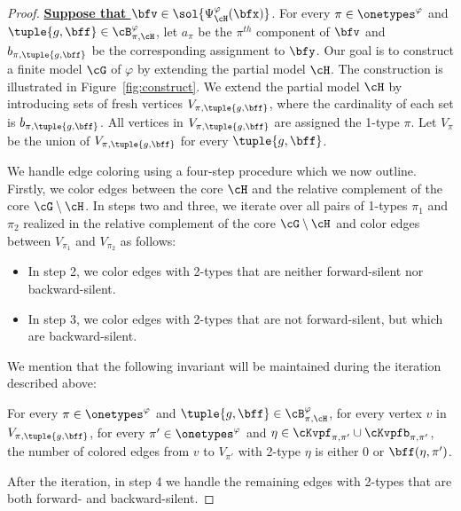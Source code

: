 \begin{proof}
    \textbf{\uline{Suppose that $\bfv \in \sol{\Psi^\varphi_\cH(\bfx)}$}}.
    For every $\pi \in \onetypes^\varphi$ and
    $\tuple{g, \bff} \in \cB^\varphi_{\pi, \cH}$,
    let $a_\pi$ be the $\pi^{th}$ component of $\bfv$ and
    $b_{\pi, \tuple{g, \bff}}$ be the corresponding assignment to $\bfy$.
    Our goal is to construct a finite model $\cG$ of $\varphi$ by extending the partial model $\cH$.
    The construction is illustrated in Figure~\ref{fig:construct}.
    We extend the partial model $\cH$ by introducing sets of fresh vertices $V_{\pi, \tuple{g, \bff}}$,
    where the cardinality of each set is $b_{\pi, \tuple{g, \bff}}$.
    All vertices in $V_{\pi, \tuple{g, \bff}}$ are assigned the 1-type $\pi$.
    Let $V_{\pi}$ be the union of $V_{\pi, \tuple{g, \bff}}$ for every $\tuple{g, \bff}$.

    We handle edge coloring using a four-step procedure which we now outline.
    Firstly, we
    color edges between the core $\cH$ and the relative complement of the core $\cG \setminus \cH$.
    In steps two and three,
    we iterate over all pairs of 1-types $\pi_1$ and $\pi_2$ realized in the relative complement of the core $\cG \setminus \cH$ and color edges between $V_{\pi_1}$ and $V_{\pi_2}$ as follows:
    \begin{itemize}
        \item In step 2, we color edges with 2-types that are neither forward-silent nor backward-silent.
        \item In step 3, we color edges with 2-types that are not forward-silent,  but which are backward-silent.
    \end{itemize}
    We mention that the following invariant will be maintained during the iteration described above:

    \medskip

    For every $\pi \in \onetypes^\varphi$ and $\tuple{g, \bff} \in \cB^\varphi_{\pi, \cH}$,
    for every vertex $v$ in $V_{\pi, \tuple{g, \bff}}$,
    for every $\pi' \in \onetypes^\varphi$ and $\eta \in \cKvpf_{\pi, \pi'} \cup \cKvpfb_{\pi, \pi'}$,
    the number of colored edges from $v$ to $V_{\pi'}$ with 2-type $\eta$ is either 0 or $\bff(\eta, \pi')$.

    \medskip

    After the iteration, in step 4 we handle the remaining edges with 2-types that are both forward- and backward-silent.
    

\end{proof}
